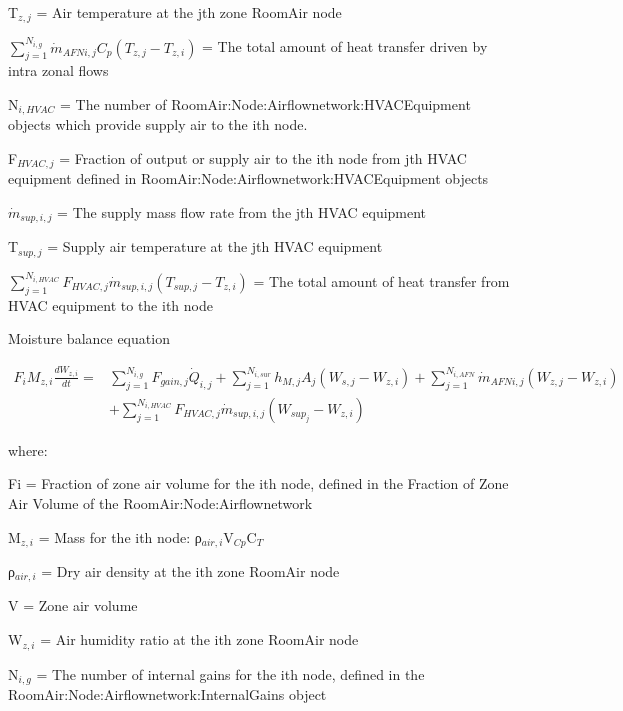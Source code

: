 T\(_{z,j}\) = Air temperature at the jth zone RoomAir node

\({\sum\limits_{j = 1}^{N_{i,g}} \dot m_{AFN i,j} {C_p}\left( T_{z,j} - T_{z,i} \right)}\) = The total amount of heat transfer driven by intra zonal flows

N\(_{i,HVAC}\) = The number of RoomAir:Node:Airflownetwork:HVACEquipment objects which provide supply air to the ith node.

F\(_{HVAC,j}\) = Fraction of output or supply air to the ith node from jth HVAC equipment defined in RoomAir:Node:Airflownetwork:HVACEquipment objects

\({\dot m}_{sup,i,j}\) = The supply mass flow rate from the jth HVAC equipment

T\(_{sup,j}\) = Supply air temperature at the jth HVAC equipment

\({\sum\limits_{j = 1}^{N_{i,HVAC}} F_{HVAC,j} \dot m_{sup,i,j} \left( T_{sup,j} - T_{z,i}\right)}\) = The total amount of heat transfer from HVAC equipment to the ith node

Moisture balance equation

\begin{equation}
\begin{split}
{F_i}{M_{z,i}}\frac{{d{W_{z,i}}}}{{dt}} =& \sum\limits_{j = 1}^{{N_{i,g}}} {{F_{gain,j}{\dot Q}_{i,j}}}  + \sum\limits_{j = 1}^{{N_{i,sur}}} {{h_{M,j}}} {A_j}\left( {{W_{s,j}} - {W_{z,i}}} \right) + \sum\limits_{j = 1}^{{N_{i,AFN}}} {{{\dot m}_{AFN i,j}}} \left( {{W_{z,j}} - {W_{z,i}}} \right)\, \\
&+ \sum\limits_{j = 1}^{{N_{i,HVAC}}} {{{F_{HVAC,j}}{\dot m}_{sup,i,j}}} \left( {{W_{sup_j}} - {W_{z,i}}} \right)
\end{split}
\end{equation}

where:

Fi = Fraction of zone air volume for the ith node, defined in the Fraction of Zone Air Volume of the RoomAir:Node:Airflownetwork

M\(_{z,i}\) = Mass for the ith node: ρ\(_{air,i}\)V\(_{Cp}\)C\(_{T}\)

ρ\(_{air,i}\) = Dry air density at the ith zone RoomAir node

V = Zone air volume

W\(_{z,i}\) = Air humidity ratio at the ith zone RoomAir node

N\(_{i,g}\) = The number of internal gains for the ith node, defined in the \\ RoomAir:Node:Airflownetwork:InternalGains object

